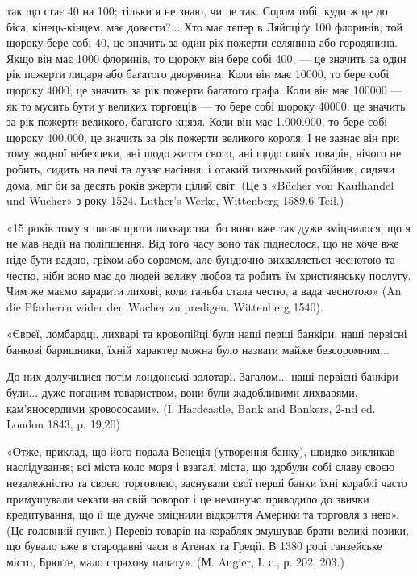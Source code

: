 \parcont{}  %
так що стає 40 на 100; тільки я не знаю, чи це так. Сором тобі, куди ж це
до біса, кінець-кінцем, має довести?... Хто має тепер в Ляйпціґу 100 флоринів,
той щороку бере собі 40, це значить за один рік пожерти селянина або городянина.
Якщо він має 1000 флоринів, то щороку він бере собі 400, — це значить
за один рік пожерти лицаря або багатого дворянина. Коли він має 10000, то
бере собі щороку 4000; це значить за рік пожерти багатого графа. Коли він
має 100000 — як то мусить бути у великих торговців — то бере собі щороку
40000: це значить за рік пожерти великого, багатого князя. Коли він має
1.000.000, то бере собі щороку 400.000, це значить за рік пожерти великого
короля. І не зазнає він при тому жодної небезпеки, ані щодо життя свого, ані
щодо своїх товарів, нічого не робить, сидить на печі та лузає насіння: і отакий
тихенький розбійник, сидячи дома, міг би за десять років зжерти цілий світ.
(Це з «Bücher von Kaufhandel und Wucher» з року 1524. Luther’s Werke, Wittenberg
1589.6 Teil.)

«15 років тому я писав проти лихварства, бо воно вже так дуже зміцнилося,
що я не мав надії на поліпшення. Від того часу воно так піднеслося, що
не хоче вже ніде бути вадою, гріхом або соромом, але бундючно вихваляється
чеснотою та честю, ніби воно має до людей велику любов та робить їм християнську
послугу. Чим же маємо зарадити лихові, коли ганьба стала честю, а
вада чеснотою» (An die Pfarherrn wider den Wucher zu predigen. Wittenberg 1540).

«Євреї, ломбардці, лихварі та кровопійці були наші перші банкіри, наші
первісні банкові баришники, їхній характер можна було назвати майже безсоромним...

До них долучилися потім лондонські золотарі. Загалом... наші первісні
банкіри були... дуже поганим товариством, вони були жадобливими лихварями,
кам’яносердими кровососами». (І. Hardcastle, Bank and Bankers, 2-nd ed. London
1843, p. 19,20)

«Отже, приклад, що його подала Венеція (утворення банку), швидко викликав
наслідування; всі міста коло моря і взагалі міста, що здобули собі
славу своєю незалежністю та своєю торговлею, заснували свої перші банки
їхні кораблі часто примушували чекати на свій поворот і це неминучо приводило
до звички кредитування, що її ще дужче зміцнили відкриття Америки та
торговля з нею». (Це головний пункт.) Перевіз товарів на кораблях змушував
брати великі позики, що бувало вже в стародавні часи в Атенах та Греції.
В 1380 році ганзейське місто, Брюґґе, мало страхову палату». (М. Augier, І. с., р.
202, 203.)

